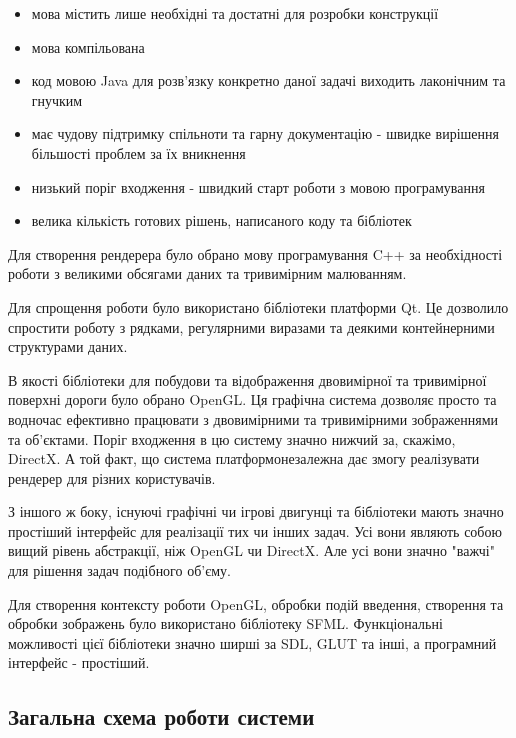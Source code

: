 \documentclass[simple,a4paper,14pt,ukrainian,utf8]{eskdtext}
\begin{document}
        \begin{itemize}
            \item мова містить лише необхідні та достатні для розробки конструкції
            \item мова компільована
            \item код мовою Java для розв’язку конкретно даної задачі виходить лаконічним та гнучким
            \item має чудову підтримку спільноти та гарну документацію - швидке вирішення більшості проблем за їх вникнення
            \item низький поріг входження - швидкий старт роботи з мовою програмування
            \item велика кількість готових рішень, написаного коду та бібліотек
        \end{itemize}
        
        Для створення рендерера було обрано мову програмування C++ за необхідності роботи з великими обсягами даних та тривимірним малюванням. 
        
        Для спрощення роботи було використано бібліотеки платформи Qt. Це дозволило спростити роботу з рядками, регулярними виразами та деякими контейнерними структурами даних.
        
        В якості бібліотеки для побудови та відображення двовимірної та тривимірної поверхні дороги було обрано OpenGL. Ця графічна система дозволяє просто та водночас ефективно працювати з двовимірними та тривимірними зображеннями та об’єктами. Поріг входження в цю систему значно нижчий за, скажімо, DirectX. А той факт, що система платформонезалежна дає змогу реалізувати рендерер для різних користувачів.
        
        З іншого ж боку, існуючі графічні чи ігрові двигунці та бібліотеки мають значно простіший інтерфейс для реалізації тих чи інших задач. Усі вони являють собою вищий рівень абстракції, ніж OpenGL чи DirectX. Але усі вони значно "важчі" для рішення задач подібного об’єму.
        
        Для створення контексту роботи OpenGL, обробки подій введення, створення та обробки зображень було використано бібліотеку SFML. Функціональні можливості цієї бібліотеки значно ширші за SDL, GLUT та інші, а програмний інтерфейс - простіший.

    \subsection{Загальна схема роботи системи}
    
\end{document}
